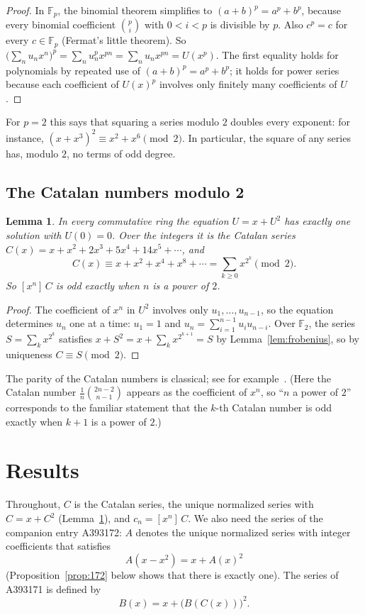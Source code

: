 \documentclass[11pt,a4paper]{article}
\newtheorem{lemma}[theorem]{Lemma}
\theoremstyle{definition}
\theoremstyle{remark}
\newcommand{\F}{\mathbb{F}}
\newcommand{\coeff}[2]{[x^{#1}]\,#2}
\begin{document}
\begin{proof}
In $\F_p$, the binomial theorem simplifies to $(a+b)^p=a^p+b^p$, because every binomial coefficient
$\binom pi$ with $0<i<p$ is divisible by $p$. Also $c^p=c$ for every $c\in\F_p$ (Fermat's little theorem). So
$\bigl(\sum_nu_nx^n\bigr)^p=\sum_nu_n^px^{pn}=\sum_nu_nx^{pn}=U(x^p)$. The first equality holds for polynomials by
repeated use of $(a+b)^p=a^p+b^p$; it holds for power series because each coefficient of $U(x)^p$ involves only finitely
many coefficients of $U$.
\end{proof}

For $p=2$ this says that squaring a series modulo $2$ doubles every exponent: for instance,
$(x+x^3)^2\equiv x^2+x^6\pmod2$. In particular, the square of any series has, modulo $2$, no terms of odd degree.

\subsection{The Catalan numbers modulo 2}
\begin{lemma}\label{lem:catalan}
In every commutative ring the equation $U=x+U^2$ has exactly one solution with $U(0)=0$. Over the integers it is the
Catalan series $C(x)=x+x^2+2x^3+5x^4+14x^5+\cdots$, and
\[
C(x)\equiv x+x^2+x^4+x^8+\cdots=\sum_{k\ge0}x^{2^k}\pmod 2 .
\]
So $\coeff{n}{C}$ is odd exactly when $n$ is a power of $2$.
\end{lemma}

\begin{proof}
The coefficient of $x^n$ in $U^2$ involves only $u_1,\dots,u_{n-1}$, so the equation determines $u_n$ one at a time:
$u_1=1$ and $u_n=\sum_{i=1}^{n-1}u_iu_{n-i}$. Over $\F_2$, the series $S=\sum_kx^{2^k}$ satisfies
$x+S^2=x+\sum_kx^{2^{k+1}}=S$ by Lemma~\ref{lem:frobenius}, so by uniqueness $C\equiv S\pmod2$.
\end{proof}
The parity of the Catalan numbers is classical; see for example~\cite{deutschsagan}. (Here the Catalan number
$\frac1{n}\binom{2n-2}{n-1}$ appears as the coefficient of $x^n$, so ``$n$ a power of $2$'' corresponds to the familiar
statement that the $k$-th Catalan number is odd exactly when $k+1$ is a power of $2$.)

\section{Results}\label{sec:results}

Throughout, $C$ is the Catalan series, the unique normalized series with $C=x+C^2$ (Lemma~\ref{lem:catalan}), and
$c_n=\coeff{n}{C}$. We also need the series of the companion entry A393172: $A$ denotes the unique normalized series with
integer coefficients that satisfies
\begin{equation}\label{eq:first}
A(x-x^2)=x+A(x)^2
\end{equation}
(Proposition~\ref{prop:172} below shows that there is exactly one). The series of A393171 is defined by
\begin{equation}\label{eq:def}
B(x)=x+\bigl(B(C(x))\bigr)^2 .
\end{equation}
\end{document}
